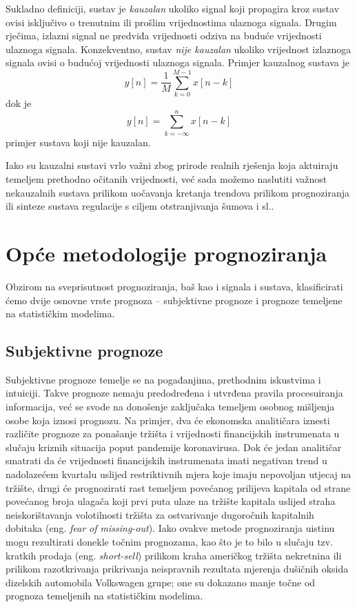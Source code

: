 \documentclass[a4paper,12pt,oneside]{memoir}
\newcommand{\kauzalni}{y[n]=\frac{1}{M}\displaystyle\sum_{k=0}^{M-1 }x[n-k]}
\newcommand{\nekauzalni}{y[n]=\displaystyle\sum_{k=-\infty}^{n}x[n-k]}
\begin{document}
                Sukladno definiciji, sustav je \textit{kauzalan} ukoliko signal koji propagira kroz sustav ovisi isključivo o trenutnim ili prošlim vrijednostima ulaznoga signala. Drugim rječima, izlazni signal ne predviđa vrijednosti odziva na buduće vrijednosti ulaznoga signala. Konzekventno, sustav \textit{nije kauzalan} ukoliko vrijednost izlaznoga signala ovisi o budućoj vrijednosti ulaznoga signala. Primjer kauzalnog sustava je
                \begin{equation}
                    \kauzalni
                \end{equation}
                dok je
                \begin{equation}
                    \nekauzalni
                \end{equation}
                primjer sustava koji nije kauzalan.

                Iako su kauzalni sustavi vrlo važni zbog prirode realnih rješenja koja aktuiraju temeljem prethodno očitanih vrijednosti, već sada možemo naslutiti važnost nekauzalnih sustava prilikom uočavanja kretanja trendova prilikom prognoziranja ili sinteze sustava regulacije s ciljem otstranjivanja šumova i sl..

    \chapter{Opće metodologije prognoziranja}
        Obzirom na sveprisutnost prognoziranja, baš kao i signala i sustava, klasificirati ćemo dvije osnovne vrste prognoza -- subjektivne prognoze i prognoze temeljene na statističkim modelima.\cite{Holden}

        \section{Subjektivne prognoze}
            Subjektivne prognoze temelje se na pogađanjima, prethodnim iskustvima i intuiciji. Takve prognoze nemaju predodređena i utvrđena pravila procesuiranja informacija, već se svode na donošenje zaključaka temeljem osobnog mišljenja osobe koja iznosi prognozu. Na primjer, dva će ekonomska analitičara iznesti različite prognoze za ponašanje tržišta i vrijednosti financijskih instrumenata u slučaju kriznih situacija poput pandemije koronavirusa. Dok će jedan analitičar smatrati da će vrijednosti financijskih instrumenata imati negativan trend u nadolazećem kvartalu uslijed restriktivnih mjera koje imaju nepovoljan utjecaj na tržište, drugi će prognozirati rast temeljem povećanog prilijeva kapitala od strane povećanog broja ulagača koji prvi puta ulaze na tržište kapitala uslijed straha neiskorištavanja volotilnosti tržišta za ostvarivanje dugoročnih kapitalnih dobitaka (eng. \textit{fear of missing-out}). Iako ovakve metode prognoziranja uistinu mogu rezultirati donekle točnim prognozama, kao što je to bilo u slučaju tzv. kratkih prodaja (eng. \textit{short-sell}) prilikom kraha američkog tržišta nekretnina ili prilikom razotkrivanja prikrivanja neispravnih rezultata mjerenja dušičnih oksida dizelskih automobila Volkswagen grupe; one su dokazano manje točne od prognoza temeljenih na statističkim modelima.
\end{document}
